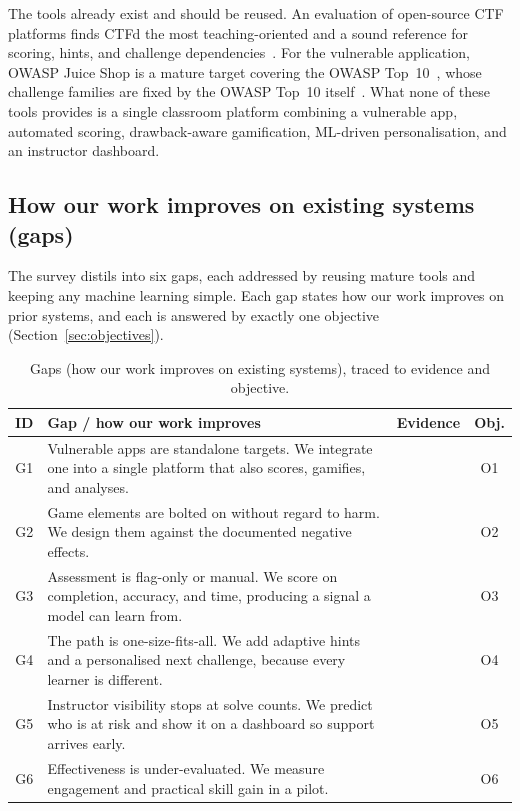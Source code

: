The tools already exist and should be reused. An evaluation of open-source CTF
platforms finds CTFd the most teaching-oriented and a sound reference for scoring,
hints, and challenge dependencies~\cite{Karagiannis2020analysis,Ctfd_docs}. For the
vulnerable application, OWASP Juice Shop is a mature target covering the OWASP
Top~10~\cite{Owasp_juiceshop}, whose challenge families are fixed by the OWASP
Top~10 itself~\cite{Owasp2021top10}. What none of these tools provides is a single
classroom platform combining a vulnerable app, automated scoring, drawback-aware
gamification, ML-driven personalisation, and an instructor dashboard.

\subsection{How our work improves on existing systems (gaps)}
\label{sec:gaps}

The survey distils into six gaps, each addressed by reusing mature tools and
keeping any machine learning simple. Each gap states how our work improves on prior systems, and
each is answered by exactly one objective (Section~\ref{sec:objectives}).

\begin{table}[htbp]
\centering
\caption{Gaps (how our work improves on existing systems), traced to evidence and objective.}
\label{tab:gaps}
\renewcommand{\arraystretch}{1.3}
\begin{tabularx}{\linewidth}{@{}c X p{2.7cm} c@{}}
\toprule
\textbf{ID} & \textbf{Gap / how our work improves} & \textbf{Evidence} & \textbf{Obj.} \\
\midrule
G1 & Vulnerable apps are standalone targets. We integrate one into a single platform
     that also scores, gamifies, and analyses.
   & \cite{Owasp_juiceshop,Karagiannis2020analysis} & O1 \\
G2 & Game elements are bolted on without regard to harm. We design them against the
     documented negative effects.
   & \cite{Toda2018dark,Almeida2023negative} & O2 \\
G3 & Assessment is flag-only or manual. We score on completion, accuracy, and time,
     producing a signal a model can learn from.
   & \cite{Chapman2014picoctf,Karagiannis2020analysis,Svabensky2024detecting} & O3 \\
G4 & The path is one-size-fits-all. We add adaptive hints and a personalised next
     challenge, because every learner is different.
   & \cite{Streicher2016adaptive,Vykopal2022smart} & O4 \\
G5 & Instructor visibility stops at solve counts. We predict who is at risk and show
     it on a dashboard so support arrives early.
   & \cite{Svabensky2024detecting} & O5 \\
G6 & Effectiveness is under-evaluated. We measure engagement and practical skill
     gain in a pilot.
   & \cite{Svabensky2020what} & O6 \\
\bottomrule
\end{tabularx}
\end{table}

